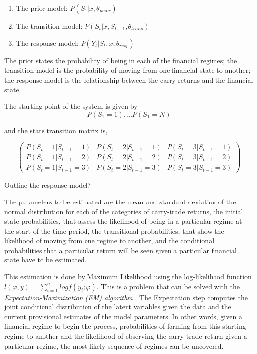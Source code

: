 \documentclass[12pt, a4paper, oneside]{article} %
\begin{document}
\begin{enumerate}
\item The prior model: $P(S_1|x, \theta_{prior})$
\item The transition model: $P(S_t|x, S_{t-1}, \theta_{trans})$
\item The response model: $P(Y_t| S_t, x, \theta_{resp})$
\end{enumerate}

The prior states the probability of being in each of the financial regimes; the transition model is the probability of moving from one financial state to another; the response model is the relationship between the carry returns and the financial state.  

The starting point of the system is given by
\begin{equation*}
P(S_1 = 1), \dots P(S_1 = N)
\end{equation*}

and the state transition matrix is, 

\begin{equation*}
\begin{pmatrix}
P(S_t = 1|S_{t-1}=1) & P(S_t = 2|S_{t-1}=1) & P(S_t = 3|S_{t-1}=1)\\
P(S_t = 1|S_{t-1}=2) & P(S_t = 2|S_{t-1}=2) & P(S_t = 3|S_{t-1}=2)\\
P(S_t = 1|S_{t-1}=3) & P(S_t = 2|S_{t-1}=3) & P(S_t = 3|S_{t-1}=3)
\end{pmatrix}
\end{equation*}

Outline the response model?

The parameters to be estimated are the mean and standard deviation  of the normal distribution for each of the categories of carry-trade returns, the initial state probabilities, that assess the likelihood of being in a particular regime at the start of the time period, the transitional probabilities, that show the likelihood of moving from one regime to another, and the conditional probabilities that a particular return will be seen given a particular financial state have to be estimated.  

This estimation is done by Maximum Likelihood using the log-likelihood function $l(\varphi, y) = \sum_{i=1}^n log f(y_i; \varphi)$. This is a problem that can be solved with the \emph{Expectation-Maximization (EM) algorithm} \citet{dempster1977maximum}. The Expectation step computes the joint conditional distribution of the latent variables given the data and the current provisional estimates of the model parameters. In other words, given a financial regime to begin the process, probabilities of forming from this starting regime to another and the likelihood of observing the carry-trade return given a particular regime, the most likely sequence of regimes can be uncovered. 
\end{document}

